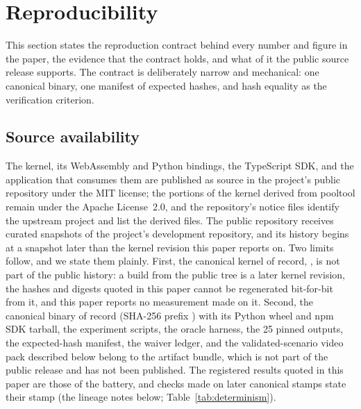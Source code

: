 \section{Reproducibility}
\label{sec:reproducibility}

This section states the reproduction contract behind every number and
figure in the paper, the evidence that the contract holds, and what of
it the public source release supports. The contract is deliberately
narrow and mechanical: one canonical binary, one manifest of expected
hashes, and hash equality as the verification criterion.

\subsection{Source availability}
\label{sec:availability}

The kernel, its WebAssembly and Python bindings, the TypeScript SDK, and
the application that consumes them are published as source in the
project's public repository under the MIT license; the portions of the
kernel derived from pooltool \citep{kiefl2024pooltool} remain under the
Apache License~2.0, and the repository's notice files identify the
upstream project and list the derived files. The public repository
receives curated snapshots of the project's development repository, and
its history begins at a snapshot later than the kernel revision this
paper reports on. Two limits follow, and we state them plainly. First,
the canonical kernel of record, , is not part of
the public history: a build from the public tree is a later kernel
revision, the hashes and digests quoted in this paper cannot be
regenerated bit-for-bit from it, and this paper reports no measurement
made on it. Second, the canonical  binary of record
(SHA-256 prefix ) with its Python wheel and npm SDK
tarball, the experiment scripts, the oracle harness, the 25 pinned
outputs, the expected-hash manifest, the waiver ledger, and the
validated-scenario video pack described below belong to the artifact
bundle, which is not part of the public release and has not been
published. The registered results quoted in this paper are those of the
 battery, and checks made on later canonical stamps
state their stamp (the lineage notes below; Table~\ref{tab:determinism}).

